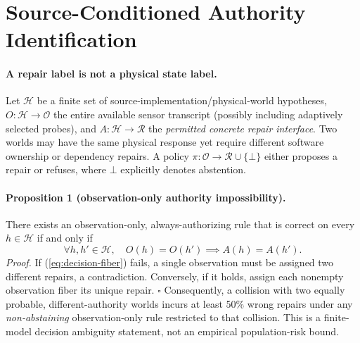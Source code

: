 \section{Source-Conditioned Authority Identification}\label{sec:authority}

\paragraph{A repair label is not a physical state label.}
Let $\mathcal H$ be a finite set of source-implementation/physical-world
hypotheses, $O:\mathcal H\to\mathcal O$ the entire available sensor
transcript (possibly including adaptively selected probes), and
$A:\mathcal H\to\mathcal R$ the \emph{permitted concrete repair interface}.
Two worlds may have the same physical response yet require different
software ownership or dependency repairs. A policy
$\pi:\mathcal O\to\mathcal R\cup\{\bot\}$ either proposes a repair or refuses,
where $\bot$ explicitly denotes abstention.

\paragraph{Proposition 1 (observation-only authority impossibility).}
There exists an observation-only, always-authorizing rule that is correct
on every $h\in\mathcal H$ if and only if
\begin{equation}
\label{eq:decision-fiber}
\forall h,h'\in\mathcal H,\quad
O(h)=O(h')\implies A(h)=A(h').
\end{equation}
\emph{Proof.} If (\ref{eq:decision-fiber}) fails, a single observation
must be assigned two different repairs, a contradiction. Conversely,
if it holds, assign each nonempty observation fiber its unique repair.
$\square$
Consequently, a collision with two equally probable, different-authority
worlds incurs at least 50\% wrong repairs under any \emph{non-abstaining}
observation-only rule restricted to that collision. This is a finite-model
decision ambiguity statement, not an empirical population-risk bound.

